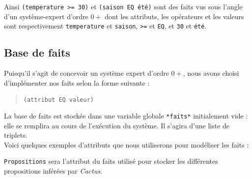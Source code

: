 \documentclass[a4paper,12pt]{article}
\begin{document}
	Ainsi \texttt{(temperature >= 30)} et \texttt{(saison EQ été)} sont des faits vus sous l'angle d'un système-expert d'ordre $0+$ dont les attributs, les opérateurs et les valeurs sont respectivement 	\texttt{temperature} et \texttt{saison}, \texttt{>=} et \texttt{EQ}, et \texttt{30} et \texttt{été}.

\subsection{Base de faits}

Puisqu'il s'agit de concevoir un système expert d'ordre $0+$, nous avons choisi d'implémenter nos faits selon la forme suivante :

\begin{quotation}
	\texttt{(attribut EQ valeur)}
\end{quotation}

La base de faits est stockée dans une variable globale \texttt{*faits*} initialement vide : elle se remplira au cours de l'exécution du système. Il s'agira d'une liste de triplets.\\

Voici quelques exemples d'attributs que nous utiliserons pour modéliser les faits :

\begin{table}[H]
		\label{exempleAttributs}
		\caption{Exemple d'attributs pour les faits}
\end{table}

\texttt{Propositions} sera l'attribut du faits utilisé pour stocker les différentes propositions inférées par \textit{Cactus}.
\end{document}
